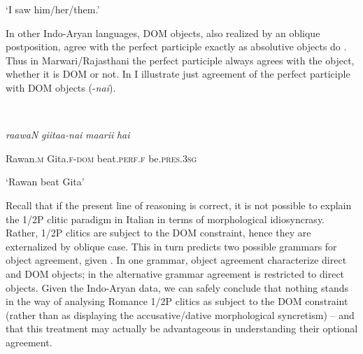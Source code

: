 \documentclass[output=paper]{langscibook}
\begin{document}
  ‘I saw him/her/them.’ 
\z 
\z 

In other Indo-Aryan languages, DOM objects, also realized by an oblique postposition, agree with the perfect participle exactly as absolutive objects do \emph{\textup{\citep[342]{Masica1991}}}. Thus in Marwari/Rajasthani the perfect participle always agrees with the object, whether it is DOM or not. In  I illustrate just agreement of the perfect participle with DOM objects (-\textit{nai}).

\ea\label{ex:key:}
{}\\
\z

\textit{raawaN}   \textit{giitaa-nai}  \textit{maarii}    \textit{hai}



  Rawan\textsc{.m}   Gita.\textsc{f-dom}   beat.\textsc{perf.f}    be.\textsc{pres.3sg}


  ‘Rawan beat Gita’

Recall that if the present line of reasoning is correct, it is not possible to explain the 1/2P clitic paradigm in Italian in terms of morphological idiosyncrasy. Rather, 1/2P clitics are subject to the DOM constraint, hence they are externalized by oblique case. This in turn predicts two possible grammars for object agreement, given . In one grammar, object agreement characterize direct and DOM objects; in the alternative grammar agreement is restricted to direct objects. Given the Indo-Aryan data, we can safely conclude that nothing stands in the way of analysing Romance 1/2P clitics as subject to the DOM constraint (rather than as displaying the accusative/dative morphological syncretism) – and that this treatment may actually be advantageous in understanding their optional agreement. 
\end{document}
